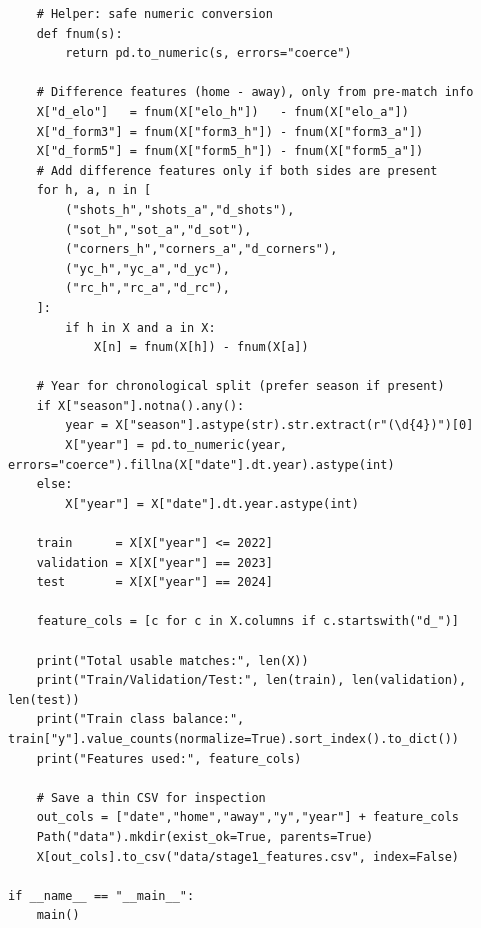 \documentclass[a4paper,12pt,twoside,english]{all-in-one}
\begin{document}
\begin{verbatim}
    # Helper: safe numeric conversion
    def fnum(s): 
        return pd.to_numeric(s, errors="coerce")

    # Difference features (home - away), only from pre-match info
    X["d_elo"]   = fnum(X["elo_h"])   - fnum(X["elo_a"])
    X["d_form3"] = fnum(X["form3_h"]) - fnum(X["form3_a"])
    X["d_form5"] = fnum(X["form5_h"]) - fnum(X["form5_a"])
    # Add difference features only if both sides are present
    for h, a, n in [
        ("shots_h","shots_a","d_shots"),
        ("sot_h","sot_a","d_sot"),
        ("corners_h","corners_a","d_corners"),
        ("yc_h","yc_a","d_yc"),
        ("rc_h","rc_a","d_rc"),
    ]:
        if h in X and a in X:
            X[n] = fnum(X[h]) - fnum(X[a])

    # Year for chronological split (prefer season if present)
    if X["season"].notna().any():
        year = X["season"].astype(str).str.extract(r"(\d{4})")[0]
        X["year"] = pd.to_numeric(year, errors="coerce").fillna(X["date"].dt.year).astype(int)
    else:
        X["year"] = X["date"].dt.year.astype(int)

    train      = X[X["year"] <= 2022]
    validation = X[X["year"] == 2023]
    test       = X[X["year"] == 2024]

    feature_cols = [c for c in X.columns if c.startswith("d_")]

    print("Total usable matches:", len(X))
    print("Train/Validation/Test:", len(train), len(validation), len(test))
    print("Train class balance:", train["y"].value_counts(normalize=True).sort_index().to_dict())
    print("Features used:", feature_cols)

    # Save a thin CSV for inspection
    out_cols = ["date","home","away","y","year"] + feature_cols
    Path("data").mkdir(exist_ok=True, parents=True)
    X[out_cols].to_csv("data/stage1_features.csv", index=False)

if __name__ == "__main__":
    main()
\end{verbatim}
\end{document}

